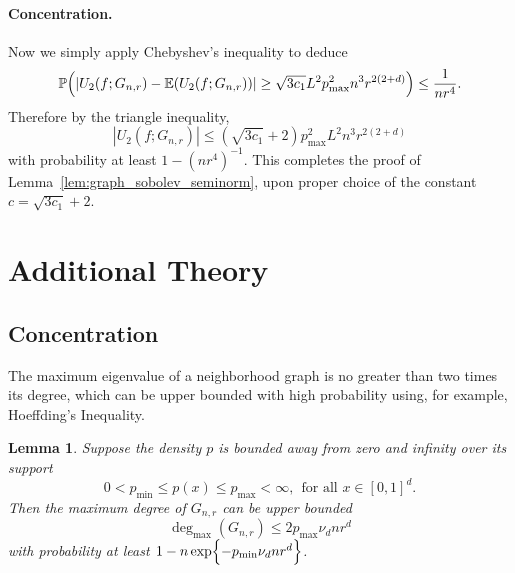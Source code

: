 \documentclass{article}
\newcommand{\abs}[1]{\left \lvert #1 \right \rvert}
\newcommand{\1}{\mathbf{1}}
\newcommand{\Pbb}{\mathbb{P}}
\newcommand{\Ebb}{\mathbb{E}}
\theoremstyle{alden}
\theoremstyle{aldenthm}
\newtheorem{lemma}{Lemma}
\theoremstyle{definition}
\theoremstyle{remark}
\begin{document}
\paragraph{Concentration.}
Now we simply apply Chebyshev's inequality to deduce
\begin{equation*}
\Pbb \Bigl(\abs{U_2(f;G_{n,r}) - \Ebb(U_2(f;G_{n,r}))} \geq \sqrt{3c_1} L^2 p_{\max}^2 n^3 r^{2(2+d)}\Bigr) \leq \frac{1}{nr^4}.
\end{equation*}
Therefore by the triangle inequality,
\begin{equation*}
\abs{U_2(f;G_{n,r})} \leq (\sqrt{3c_1} + 2) p_{\max}^2 L^2 n^3 r^{2(2+d)}
\end{equation*}
with probability at least $1 - (nr^4)^{-1}$. This completes the proof of Lemma~\ref{lem:graph_sobolev_seminorm}, upon proper choice of the constant $c = \sqrt{3c_1} + 2$.


\section{Additional Theory}

\subsection{Concentration}

The maximum eigenvalue of a neighborhood graph is no greater than two times its degree, which can be upper bounded with high probability using, for example, Hoeffding's Inequality.
\begin{lemma}
	\label{lem:max_degree}
	Suppose the density $p$ is bounded away from zero and infinity over its support
	\begin{equation*}
	0 < p_{\min} \leq p(x) \leq p_{\max} < \infty,~~\textrm{for all $x \in [0,1]^d$.}
	\end{equation*}
	Then the maximum degree of $G_{n,r}$ can be upper bounded
	\begin{equation*}
	\deg_{\max}(G_{n,r}) \leq 2 p_{\max} \nu_d n r^d
	\end{equation*} 
	with probability at least $1 - n \exp\Bigl\{- p_{\min} \nu_d n r^d \Bigr\}$. 
\end{lemma}
\end{document}
